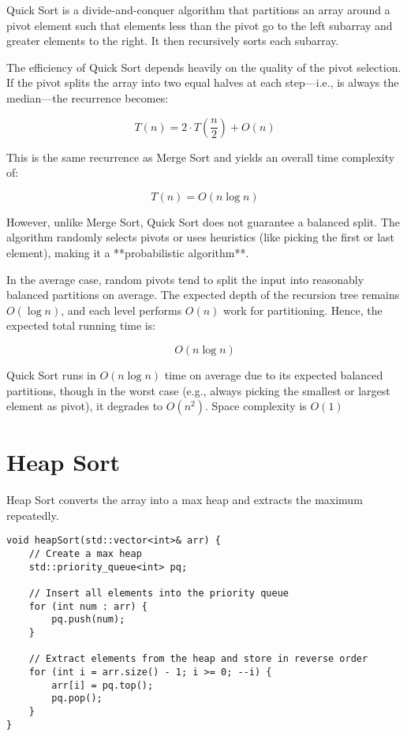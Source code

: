 \documentclass{article}
\begin{document}
Quick Sort is a divide-and-conquer algorithm that partitions an array around a pivot element such that elements less than the pivot go to the left subarray and greater elements to the right. It then recursively sorts each subarray.

The efficiency of Quick Sort depends heavily on the quality of the pivot selection. If the pivot splits the array into two equal halves at each step—i.e., is always the median—the recurrence becomes:

\[
T(n) = 2 \cdot T\left(\frac{n}{2}\right) + O(n)
\]

This is the same recurrence as Merge Sort and yields an overall time complexity of:

\[
T(n) = O(n \log n)
\]

However, unlike Merge Sort, Quick Sort does not guarantee a balanced split. The algorithm randomly selects pivots or uses heuristics (like picking the first or last element), making it a **probabilistic algorithm**.

In the average case, random pivots tend to split the input into reasonably balanced partitions on average. The expected depth of the recursion tree remains $O(\log n)$, and each level performs $O(n)$ work for partitioning. Hence, the expected total running time is:

\[
O(n \log n)
\]

Quick Sort runs in $O(n \log n)$ time on average due to its expected balanced partitions, though in the worst case (e.g., always picking the smallest or largest element as pivot), it degrades to $O(n^2)$. Space complexity is $O(1)$

\section{Heap Sort}
Heap Sort converts the array into a max heap and extracts the maximum repeatedly.

\begin{lstlisting}[style=cppstyle]
void heapSort(std::vector<int>& arr) {
    // Create a max heap
    std::priority_queue<int> pq;

    // Insert all elements into the priority queue
    for (int num : arr) {
        pq.push(num);
    }

    // Extract elements from the heap and store in reverse order
    for (int i = arr.size() - 1; i >= 0; --i) {
        arr[i] = pq.top();
        pq.pop();
    }
}
\end{lstlisting}
\end{document}

